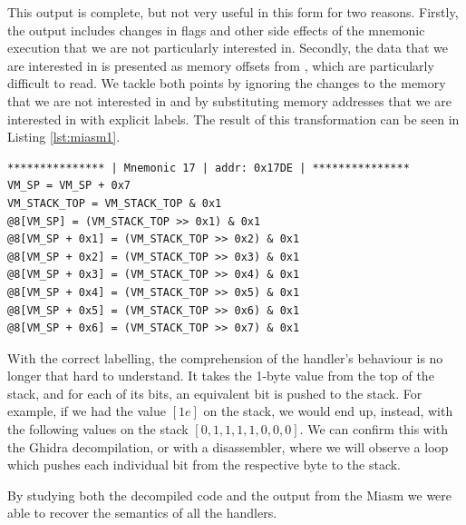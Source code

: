 
This output is complete, but not very useful in this form for two reasons. Firstly, the output includes changes in flags and other side effects of the mnemonic execution that we are not particularly interested in. Secondly, the data that we are interested in is presented as memory offsets from , which are particularly difficult to read. We tackle both points by ignoring the changes to the memory that we are not interested in and by substituting memory addresses that we are interested in with explicit labels. The result of this transformation can be seen in Listing \ref{lst:miasm1}.

\begin{lstlisting}[label={lst:miasm1}, caption={Result of symbolically executing the same function handler as in Listing \ref{lst:miasm0} with some cleanup. We only chose to display the change in relevant registers and memory locations. Additionally, we introduced labels for better clarity.}]
*************** | Mnemonic 17 | addr: 0x17DE | ***************
VM_SP = VM_SP + 0x7
VM_STACK_TOP = VM_STACK_TOP & 0x1
@8[VM_SP] = (VM_STACK_TOP >> 0x1) & 0x1
@8[VM_SP + 0x1] = (VM_STACK_TOP >> 0x2) & 0x1
@8[VM_SP + 0x2] = (VM_STACK_TOP >> 0x3) & 0x1
@8[VM_SP + 0x3] = (VM_STACK_TOP >> 0x4) & 0x1
@8[VM_SP + 0x4] = (VM_STACK_TOP >> 0x5) & 0x1
@8[VM_SP + 0x5] = (VM_STACK_TOP >> 0x6) & 0x1
@8[VM_SP + 0x6] = (VM_STACK_TOP >> 0x7) & 0x1
\end{lstlisting}

With the correct labelling, the comprehension of the handler's behaviour is no longer that hard to understand. It takes the 1-byte value from the top of the stack, and for each of its bits, an equivalent bit is pushed to the stack. For example, if we had the value $[1e]$ on the stack, we would end up, instead, with the following values on the stack $[0, 1, 1, 1, 1, 0, 0, 0]$. We can confirm this with the Ghidra decompilation, or with a disassembler, where we will observe a loop which pushes each individual bit from the respective byte to the stack. 

By studying both the decompiled code and the output from the Miasm we were able to recover the semantics of all the handlers. 


